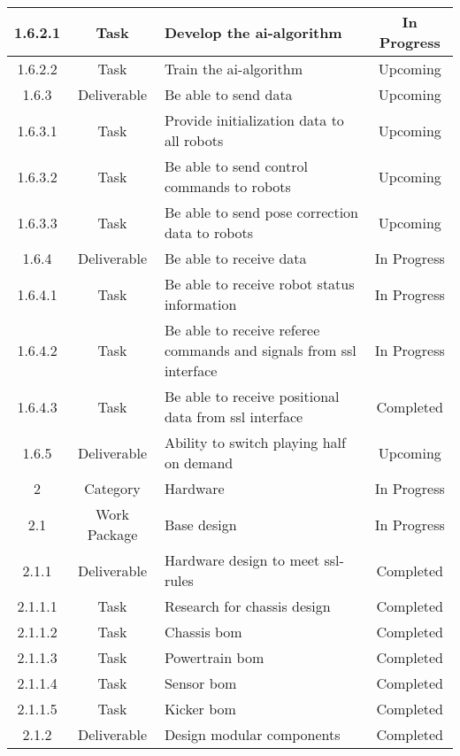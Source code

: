 \begin{longtable}{|c|c|m{}|c|}
    \rowcolor{p} 1.6.2.1 & Task & Develop the \acs{ai}-algorithm & In Progress \\ \hline
    \rowcolor{u} 1.6.2.2 & Task & Train the \acs{ai}-algorithm & Upcoming \\ \hline
    \rowcolor{u} 1.6.3 & Deliverable & Be able to send data & Upcoming \\ \hline
    \rowcolor{u} 1.6.3.1 & Task & Provide initialization data to all robots & Upcoming \\ \hline
    \rowcolor{u} 1.6.3.2 & Task & Be able to send control commands to robots & Upcoming \\ \hline
    \rowcolor{u} 1.6.3.3 & Task & Be able to send pose correction data to robots & Upcoming \\ \hline
    \rowcolor{p} 1.6.4 & Deliverable & Be able to receive data & In Progress \\ \hline
    \rowcolor{p} 1.6.4.1 & Task & Be able to receive robot status information & In Progress \\ \hline
    \rowcolor{p} 1.6.4.2 & Task & Be able to receive referee commands and signals from \acs{ssl} interface & In Progress \\ \hline
    \rowcolor{d} 1.6.4.3 & Task & Be able to receive positional data from \acs{ssl} interface & Completed \\ \hline
    \rowcolor{u} 1.6.5 & Deliverable & Ability to switch playing half on demand & Upcoming \\ \hline
    \rowcolor{p} 2 & Category & Hardware & In Progress \\ \hline
    \rowcolor{p} 2.1 & Work Package & Base design & In Progress \\ \hline
    \rowcolor{d} 2.1.1 & Deliverable & Hardware design to meet \acs{ssl}-rules & Completed \\ \hline
    \rowcolor{d} 2.1.1.1 & Task & Research for chassis design & Completed \\ \hline
    \rowcolor{d} 2.1.1.2 & Task & Chassis \acs{bom} & Completed \\ \hline
    \rowcolor{d} 2.1.1.3 & Task & Powertrain \acs{bom} & Completed \\ \hline
    \rowcolor{d} 2.1.1.4 & Task & Sensor \acs{bom} & Completed \\ \hline
    \rowcolor{d} 2.1.1.5 & Task & Kicker \acs{bom} & Completed \\ \hline
    \rowcolor{d} 2.1.2 & Deliverable & Design modular components & Completed \\ \hline

\end{longtable}
